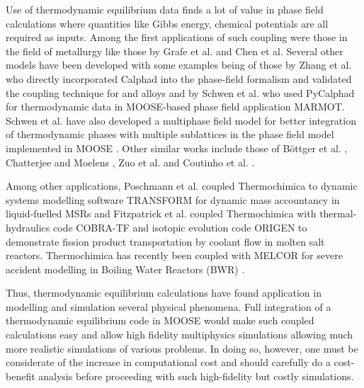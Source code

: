 	Use of thermodynamic equilibrium data finds a lot of value in phase field calculations where quantities like Gibbs energy, chemical potentials are all required as inputs. Among the first applications of such coupling were those in the field of metallurgy like those by Grafe et al. \cite{Grafe:2000aa} and Chen et al. \cite{Chen:2005aa} Several other models have been developed with some examples being of those by Zhang et al. \cite{Zhang:2015aa} who directly incorporated Calphad into the phase-field formalism and validated the coupling technique for  and  alloys and by Schwen et al. \cite{Schwen:2017aa} who used PyCalphad for thermodynamic data in  MOOSE-based phase field application MARMOT. Schwen et al. have also developed a multiphase field model for better integration of thermodynamic phases with multiple sublattices in the phase field model implemented in MOOSE \cite{Schwen:2021aa}. Other similar works include those of B\"{o}ttger et al. \cite{Bottger:2020aa}, Chatterjee and Moelens \cite{Chatterjee:2021aa}, Zuo et al. \cite{Zuo:2021aa} and Coutinho et al. \cite{Coutinho:2022aa}.

	Among other applications, Poschmann et al. \cite{Poschmann:2022aa} coupled Thermochimica to dynamic systems modelling software TRANSFORM for dynamic mass accountancy in liquid-fuelled MSRs and  Fitzpatrick et al. \cite{Fitzpatrick18} coupled Thermochimica with thermal-hydraulics code COBRA-TF and isotopic evolution code ORIGEN to demonstrate fission product transportation by coolant flow in molten salt reactors. Thermochimica has recently been coupled with MELCOR for severe accident modelling in Boiling Water Reactors (BWR) \cite{Breeden:2022aa}.

	Thus, thermodynamic equilibrium calculations have found application in modelling and simulation several physical phenomena. Full integration of a thermodynamic equilibrium code in {MOOSE} would make such coupled calculations easy and allow high fidelity multiphysics simulations allowing much more realistic simulations of various problems. In doing so, however, one must be considerate of the increase in computational cost and should carefully do a cost-benefit analysis before proceeding with such high-fidelity but costly simulations.

